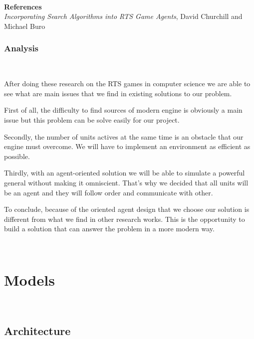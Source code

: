\documentclass[a4paper,10pt]{book}
\begin{document}
~

\textbf{References} 
\textit{\\Incorporating Search Algorithms into RTS Game Agents},
David Churchill and Michael Buro

\subsection{Analysis}

~

After doing these research on the RTS games in computer science we are able to see what are main issues that we find in existing solutions to our problem.

First of all, the difficulty to find sources of modern engine is obviously a main issue but this problem can be solve easily for our project.

Secondly, the number of units actives at the same time is an obstacle that our engine must overcome. We will have to implement an environment as efficient as possible.

Thirdly, with an agent-oriented solution we will be able to simulate a powerful general without making it omniscient. That's why we decided that all units will be an agent and they will follow order and communicate with other.

To conclude, because of the oriented agent design that we choose our solution is different from what we find in other research works. This is the opportunity to build a solution that can answer the problem in a more modern way.

~

\newpage
\chapter {Models}

~

\section {Architecture}

~
\end{document}
